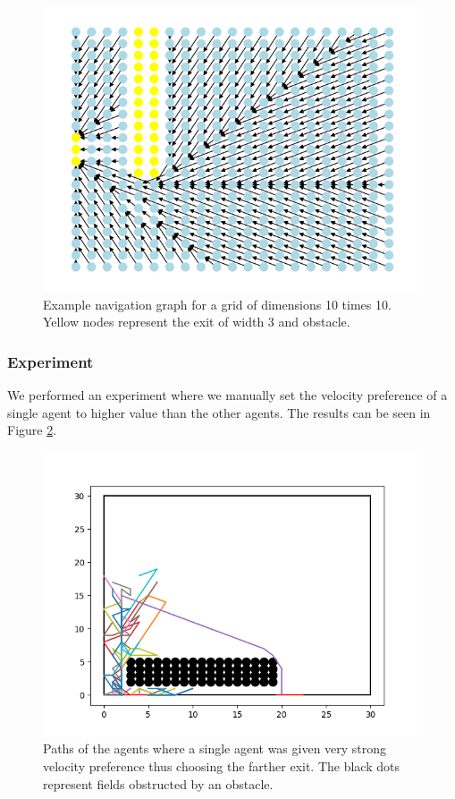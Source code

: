 \documentclass[9pt]{pnas-new}
\begin{document}
\begin{figure}[h!]
    \centering
    \includegraphics[width=0.5\linewidth]{fig/dijkstra.png}
    \caption{Example navigation graph for a grid of dimensions 10 times 10. Yellow nodes represent the exit of width 3 and obstacle.}
    \label{fig:spgraph}
\end{figure}



\subsubsection{Experiment}
We performed an experiment where we manually set the velocity preference of a single agent to higher value than the other agents. The results can be seen in Figure \ref{fig:outlier}.
\begin{figure}[htb]
    \centering
    \includegraphics[width=0.5\linewidth]{fig/path_plot_single_outlier.png}
    \caption{Paths of the agents where a single agent was given very strong velocity preference thus choosing the farther exit. The black dots represent fields obstructed by an obstacle.}
    \label{fig:outlier}
\end{figure}
\end{document}
